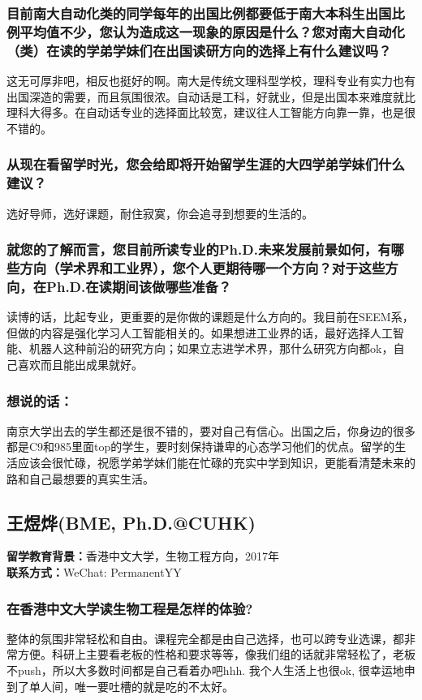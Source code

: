 \documentclass[a4paper,UTF8]{book}
\begin{document}
    \subsubsection*{目前南大自动化类的同学每年的出国比例都要低于南大本科生出国比例平均值不少，您认为造成这一现象的原因是什么？您对南大自动化（类）在读的学弟学妹们在出国读研方向的选择上有什么建议吗？}
    这无可厚非吧，相反也挺好的啊。南大是传统文理科型学校，理科专业有实力也有出国深造的需要，而且氛围很浓。自动话是工科，好就业，但是出国本来难度就比理科大得多。在自动话专业的选择面比较宽，建议往人工智能方向靠一靠，也是很不错的。
    
    \subsubsection*{从现在看留学时光，您会给即将开始留学生涯的大四学弟学妹们什么建议？}
    选好导师，选好课题，耐住寂寞，你会追寻到想要的生活的。

    \subsubsection*{就您的了解而言，您目前所读专业的Ph.D.未来发展前景如何，有哪些方向（学术界和工业界），您个人更期待哪一个方向？对于这些方向，在Ph.D.在读期间该做哪些准备？}
    读博的话，比起专业，更重要的是你做的课题是什么方向的。我目前在SEEM系，但做的内容是强化学习人工智能相关的。如果想进工业界的话，最好选择人工智能、机器人这种前沿的研究方向；如果立志进学术界，那什么研究方向都ok，自己喜欢而且能出成果就好。
                    
    \subsubsection{想说的话：}
    南京大学出去的学生都还是很不错的，要对自己有信心。出国之后，你身边的很多都是C9和985里面top的学生，要时刻保持谦卑的心态学习他们的优点。留学的生活应该会很忙碌，祝愿学弟学妹们能在忙碌的充实中学到知识，更能看清楚未来的路和自己最想要的真实生活。
        

    
\clearpage
\subsection{王煜烨(BME, Ph.D.@CUHK)}
    \textbf{留学教育背景：}香港中文大学，生物工程方向，2017年\\
    \textbf{联系方式：}WeChat: PermanentYY

    \subsubsection*{在香港中文大学读生物工程是怎样的体验?}
    整体的氛围非常轻松和自由。课程完全都是由自己选择，也可以跨专业选课，都非常方便。科研上主要看老板的性格和要求等等，像我们组的话就非常轻松了，老板不push，所以大多数时间都是自己看着办吧hhh. 我个人生活上也很ok, 很幸运地申到了单人间，唯一要吐槽的就是吃的不太好。
\end{document}
